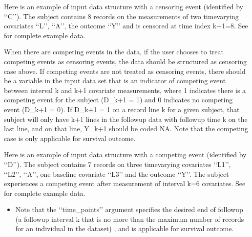 \documentclass[letterpaper,10pt,english]{sphinxmanual}
\begin{document}
\sphinxAtStartPar
Here is an example of input data structure with a censoring event (identified by ‘‘C’’). The subject contains 8 records on the measurements of
two time\sphinxhyphen{}varying covariates ‘‘L’’, ‘‘A’’, the outcome ‘‘Y’’ and is censored at time index k+1=8. See  for complete example data.
\begin{quote}

\end{quote}

\sphinxAtStartPar
{} When there are competing events in the data, if the user chooses to treat competing
events as censoring events, the data should be structured as censoring case above. If competing events
are not treated as censoring events, there should be a variable in the input data set that is an
indicator of competing event between interval k and k+1 covariate measurements, where
1 indicates there is a competing event for the subject (D\_k+1 = 1) and 0 indicates no competing event (D\_k+1 = 0).
If D\_k+1 = 1 on a record line k for a given subject, that subject will only have k+1 lines
in the follow\sphinxhyphen{}up data with follow\sphinxhyphen{}up time k on the last line, and on that line, Y\_k+1 should be coded NA.
Note that the competing case is only applicable for survival outcome.

\sphinxAtStartPar
Here is an example of input data structure with a competing event (identified by ‘‘D’’). The subject contains 7 records on
three time\sphinxhyphen{}varying covariates ‘‘L1’’, ‘‘L2’’, ‘‘A’’, one baseline covariate ‘‘L3’’ and the outcome ‘‘Y’’.
The subject experiences a competing event after measurement of interval k=6 covariates. See  for complete example data.
\begin{quote}

\end{quote}
\begin{itemize}
\item {} 
\sphinxAtStartPar
Note that the ‘‘time\_points’’ argument specifies the desired end of follow\sphinxhyphen{}up (a
follow\sphinxhyphen{}up interval k that is no more than the maximum number of records for an individual in the dataset) , and is applicable for survival outcome.

\end{itemize}
\end{document}
